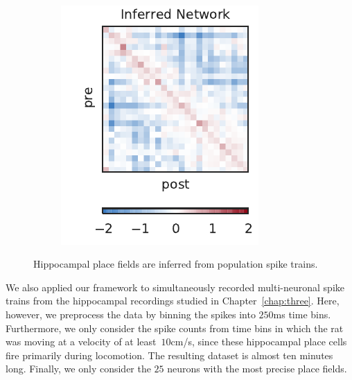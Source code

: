 \begin{figure}[t!]
\begin{subfigure}[b]{2.25in}
    \label{fig:hipp_pll}
  \end{subfigure}
  ~
  \begin{subfigure}[b]{1.85in}
    \centering
    \caption{}
    \vspace{-.2in}
    \includegraphics[width=\textwidth]{figures/ch5/hipp_connectivity.pdf}
    \label{fig:hipp_conn}
  \end{subfigure}
  \vspace{-2em}
  \caption[Hippocampal place fields inferred from spike trains]{
    Hippocampal place fields are inferred from population spike trains.
    }
  \label{fig:hipp5}
\end{figure}

We also applied our framework to simultaneously recorded
multi-neuronal spike trains from the hippocampal recordings studied in 
Chapter~\ref{chap:three}. Here, however, we preprocess the data by 
binning the spikes into $250$ms time bins. Furthermore, we only consider the 
spike counts from time bins in which the rat was moving at 
a velocity of at least~$10$cm/s, since these hippocampal place cells 
fire primarily during locomotion. The resulting dataset is almost ten
minutes long. Finally, we only consider the $25$ neurons with the most 
precise place fields. 


